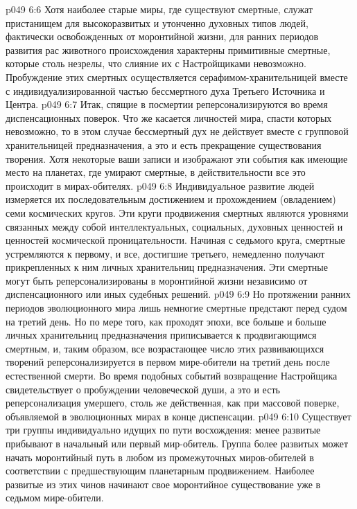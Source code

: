 \vs p049 6:6 Хотя наиболее старые миры, где существуют смертные, служат пристанищем для высокоразвитых и утонченно духовных типов людей, фактически освобожденных от моронтийной жизни, для ранних периодов развития рас животного происхождения характерны примитивные смертные, которые столь незрелы, что слияние их с Настройщиками невозможно. Пробуждение этих смертных осуществляется серафимом\hyp{}хранительницей вместе с индивидуализированной частью бессмертного духа Третьего Источника и Центра.
\vs p049 6:7 Итак, спящие в посмертии реперсонализируются во время диспенсационных поверок. Что же касается личностей мира, спасти которых невозможно, то в этом случае бессмертный дух не действует вместе с групповой хранительницей предназначения, а это и есть прекращение существования творения. Хотя некоторые ваши записи и изображают эти события как имеющие место на планетах, где умирают смертные, в действительности все это происходит в мирах\hyp{}обителях.
\vs p049 6:8 \bibnobreakspace {} Индивидуальное развитие людей измеряется их последовательным достижением и прохождением (овладением) семи космических кругов. Эти круги продвижения смертных являются уровнями связанных между собой интеллектуальных, социальных, духовных ценностей и ценностей космической проницательности. Начиная с седьмого круга, смертные устремляются к первому, и все, достигшие третьего, немедленно получают прикрепленных к ним личных хранительниц предназначения. Эти смертные могут быть реперсонализированы в моронтийной жизни независимо от диспенсационного или иных судебных решений.
\vs p049 6:9 Но протяжении ранних периодов эволюционного мира лишь немногие смертные предстают перед судом на третий день. Но по мере того, как проходят эпохи, все больше и больше личных хранительниц предназначения приписывается к продвигающимся смертным, и, таким образом, все возрастающее число этих развивающихся творений реперсонализируется в первом мире\hyp{}обители на третий день после естественной смерти. Во время подобных событий возвращение Настройщика свидетельствует о пробуждении человеческой души, а это и есть реперсонализация умершего, столь же действенная, как при массовой поверке, объявляемой в эволюционных мирах в конце диспенсации.
\vs p049 6:10 Существует три группы индивидуально идущих по пути восхождения: менее развитые прибывают в начальный или первый мир\hyp{}обитель. Группа более развитых может начать моронтийный путь в любом из промежуточных миров\hyp{}обителей в соответствии с предшествующим планетарным продвижением. Наиболее развитые из этих чинов начинают свое моронтийное существование уже в седьмом мире\hyp{}обители.
